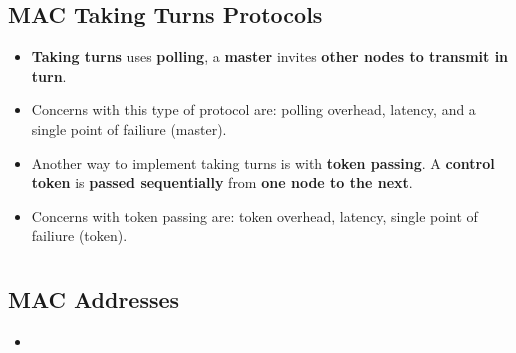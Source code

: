 \documentclass{article}
\begin{document}
    \subsection*{MAC Taking Turns Protocols}
    \begin{itemize}
        \item \textbf{Taking turns} uses \textbf{polling}, a \textbf{master} invites \textbf{other nodes to transmit in turn}.
        \item Concerns with this type of protocol are: polling overhead, latency, and a single point of failiure (master).
        \item Another way to implement taking turns is with \textbf{token passing}. A \textbf{control token} is \textbf{passed sequentially} from \textbf{one node to the next}.
        \item Concerns with token passing are: token overhead, latency, single point of failiure (token).
    \end{itemize}

    \section*{}

    \subsection*{MAC Addresses}
    \begin{itemize}
        \item 
    \end{itemize}
\end{document}
